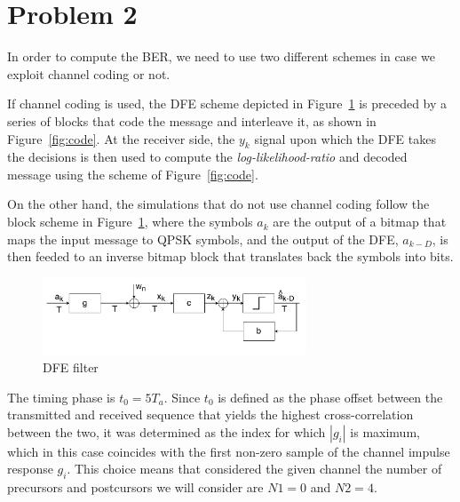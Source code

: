 \documentclass[10pt]{article}
\begin{document}

\section*{Problem 2}
In order to compute the BER, we need to use two different schemes in case we exploit channel coding or not. 

If channel coding is used, the DFE scheme depicted in Figure~\ref{fig:DFE_system} is preceded by a series of blocks that code the message and interleave it, as shown in Figure~\ref{fig:code}. At the receiver side, the $y_k$ signal upon which the DFE takes the decisions is then used to compute the \emph{log-likelihood-ratio} and decoded message using the scheme of Figure~\ref{fig:code}.

On the other hand, the simulations that do not use channel coding follow the block scheme in Figure~\ref{fig:DFE_system}, where the symbols $a_k$ are the output of a bitmap that maps the input message to QPSK symbols, and the output of the DFE, $\hat{a}_{k-D}$, is then feeded to an inverse bitmap block that translates back the symbols into bits.

\begin{figure}[h!]
	\centering
	\includegraphics[width = 0.7\textwidth]{DFE}
	\caption{DFE filter}
	\label{fig:DFE_system}
\end{figure}

The timing phase is $t_0 = 5 T_a$. Since $t_0$ is defined as the phase offset between the transmitted and received sequence that yields the highest cross-correlation between the two, it was determined as the index for which $|g_i|$ is maximum, which in this case coincides with the first non-zero sample of the channel impulse response ${g_i}$. This choice means that considered the given channel the number of precursors and postcursors we will consider are $N1 = 0$ and $N2 = 4$. 
\end{document}

